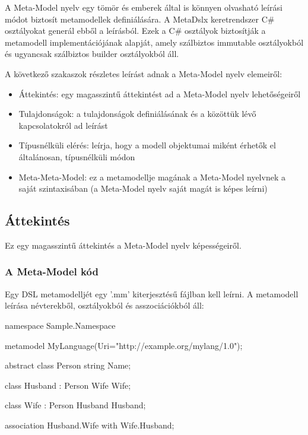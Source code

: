 \documentclass[12pt, a4paper]{report}
\begin{document}
A Meta-Model nyelv egy tömör és emberek által is könnyen olvasható leírási módot biztosít metamodellek definiálására. A MetaDslx keretrendszer C\# osztályokat generál ebből a leírásból. Ezek a C\# osztályok biztosítják a metamodell implementációjának alapját, amely szálbiztos immutable osztályokból és ugyancsak szálbiztos builder osztályokból áll.

A következő szakaszok részletes leírást adnak a Meta-Model nyelv elemeiről:

\begin{itemize}
	\item Áttekintés: egy magasszintű áttekintést ad a Meta-Model nyelv lehetőségeiről
	\item Tulajdonságok: a tulajdonságok definiálásának és a közöttük lévő kapcsolatokról ad leírást
	\item Típusnélküli elérés: leírja, hogy a modell objektumai miként érhetők el általánosan, típusnélküli módon
	\item Meta-Meta-Model: ez a metamodellje magának a Meta-Model nyelvnek a saját szintaxisában (a Meta-Model nyelv saját magát is képes leírni)
\end{itemize}

\subsection{Áttekintés}

Ez egy magasszintű áttekintés a Meta-Model nyelv képességeiről.

\subsubsection{A Meta-Model kód}

Egy DSL metamodelljét egy '.mm' kiterjesztésű fájlban kell leírni. A metamodell leírása névterekből, osztályokból és asszociációkból áll:

\begin{mmcode}
namespace Sample.Namespace
{
	metamodel MyLanguage(Uri="http://example.org/mylang/1.0"); 
	
	abstract class Person
	{
		string Name;
	}
	
	class Husband : Person
	{
		Wife Wife;
	}
	
	class Wife : Person
	{
		Husband Husband;
	}
	
	association Husband.Wife with Wife.Husband;
}

\end{mmcode}
\end{document}
